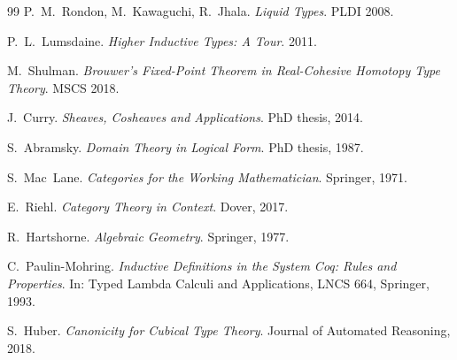 \documentclass[11pt,a4paper]{report}
\theoremstyle{definition}
\theoremstyle{plain}
\begin{document}
\begin{thebibliography}{99}
P.~M.~Rondon, M.~Kawaguchi, R.~Jhala.
\emph{Liquid Types}.
PLDI 2008.

P.~L.~Lumsdaine.
\emph{Higher Inductive Types: A Tour}.
2011.

M.~Shulman.
\emph{Brouwer's Fixed-Point Theorem in Real-Cohesive Homotopy Type Theory}.
MSCS 2018.

J.~Curry.
\emph{Sheaves, Cosheaves and Applications}.
PhD thesis, 2014.

S.~Abramsky.
\emph{Domain Theory in Logical Form}.
PhD thesis, 1987.

S.~Mac~Lane.
\emph{Categories for the Working Mathematician}.
Springer, 1971.

E.~Riehl.
\emph{Category Theory in Context}.
Dover, 2017.

R.~Hartshorne.
\emph{Algebraic Geometry}.
Springer, 1977.

C.~Paulin-Mohring.
\emph{Inductive Definitions in the System Coq: Rules and Properties}.
In: Typed Lambda Calculi and Applications, LNCS 664, Springer, 1993.

S.~Huber.
\emph{Canonicity for Cubical Type Theory}.
Journal of Automated Reasoning, 2018.

\end{thebibliography}
\end{document}
